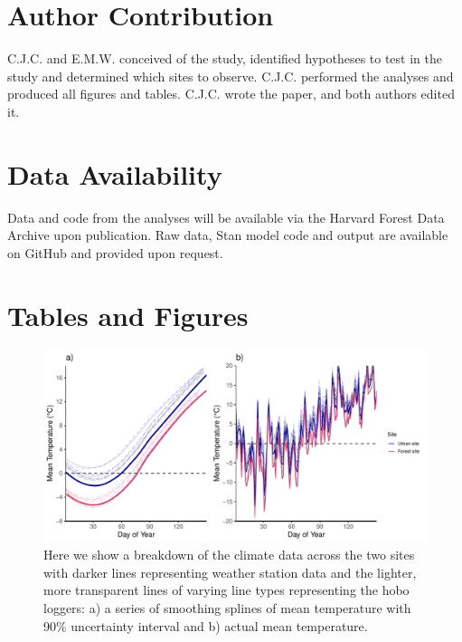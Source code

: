 \documentclass{article}\usepackage[]{graphicx}\usepackage[]{color}
\begin{document}
\section*{Author Contribution} 
C.J.C. and E.M.W. conceived of the study, identified hypotheses to test in the study and determined which sites to observe. C.J.C. performed the analyses and produced all figures and tables. C.J.C. wrote the paper, and both authors edited it.

\section*{Data Availability}
Data and code from the analyses will be available via the Harvard Forest Data Archive upon publication. Raw data, {Stan} model code and output are available on GitHub and provided upon request.




\section*{Tables and Figures}

{\begin{figure} [H]
  \begin{center}
  \includegraphics[width=16cm]{..//analyses/figures/climate_smooth&daily.pdf}
  \caption{Here we show a breakdown of the climate data across the two sites with darker lines representing weather station data and the lighter, more transparent lines of varying line types representing the hobo loggers: a) a series of smoothing splines of mean temperature with 90\% uncertainty interval and b) actual mean temperature.}\label{fig:clim}
  \end{center}
  \end{figure}}
  
\end{document}
